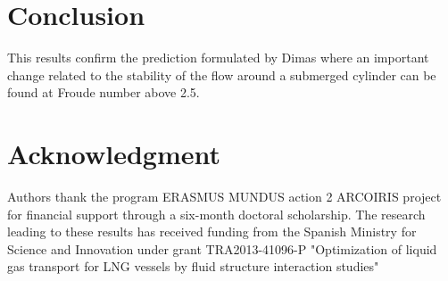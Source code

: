 \documentclass[a4paper,conference]{IEEEtran}
\begin{document}



\section{Conclusion}
This results confirm the prediction formulated by Dimas \cite{Dimas} where an important change related to the stability of the flow around a submerged cylinder can be found at Froude number above 2.5. 

\section*{Acknowledgment}
Authors thank the program ERASMUS MUNDUS action 2 ARCOIRIS project for financial support through a six-month doctoral scholarship. The research leading to these results has received funding from the Spanish Ministry for Science and Innovation under grant TRA2013-41096-P
"Optimization of liquid gas transport for LNG vessels by fluid structure interaction studies"



\end{document}
